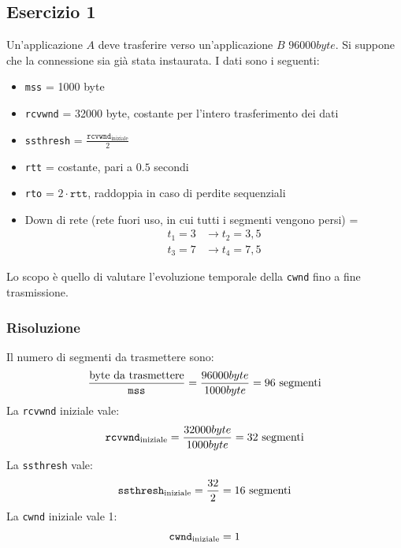\documentclass[a4paper]{article}
\begin{document}
\subsection{Esercizio 1}
Un'applicazione \( A \) deve trasferire verso un'applicazione \( B \) \( 96000 byte \).
Si suppone che la connessione sia già stata instaurata. I dati sono i seguenti:
\begin{itemize}
  \item \texttt{mss} = 1000 byte
  \item \texttt{rcvwnd} = 32000 byte, costante per l'intero trasferimento dei dati
  \item \texttt{ssthresh} = \( \frac{\texttt{rcvwnd}_{\text{iniziale}}}{2} \) 
  \item \texttt{rtt} = costante, pari a \( 0.5 \) secondi
  \item \texttt{rto} = \( 2 \cdot \texttt{rtt} \), raddoppia in caso di perdite sequenziali
  \item Down di rete (rete fuori uso, in cui tutti i segmenti vengono persi) = 
    \[
    \begin{aligned}
      t_1 = 3 &\to t_2 = 3,5\\
      t_3 = 7 &\to t_4 = 7,5
    \end{aligned}
    \] 
\end{itemize}
Lo scopo è quello di valutare l'evoluzione temporale della \texttt{cwnd} fino a fine
trasmissione.

\subsubsection{Risoluzione}
Il numero di segmenti da trasmettere sono:
\[
  \frac{\text{byte da trasmettere}}{\text{\texttt{mss}}} = \frac{96000 byte}{1000 byte}
  = 96 \text{ segmenti}
\] 
La \texttt{rcvwnd} iniziale vale:
\[
  \text{\texttt{rcvwnd}}_{\text{iniziale}} = \frac{32000 byte}{1000 byte} = 32 \text{ segmenti}
\] 
La \texttt{ssthresh} vale:
\[
  \text{\texttt{ssthresh}}_{\text{iniziale}} = \frac{32}{2} = 16 \text{ segmenti}
\]
La \texttt{cwnd} iniziale vale 1:
\[
  \text{\texttt{cwnd}}_{\text{iniziale}} = 1
\] 
\end{document}
